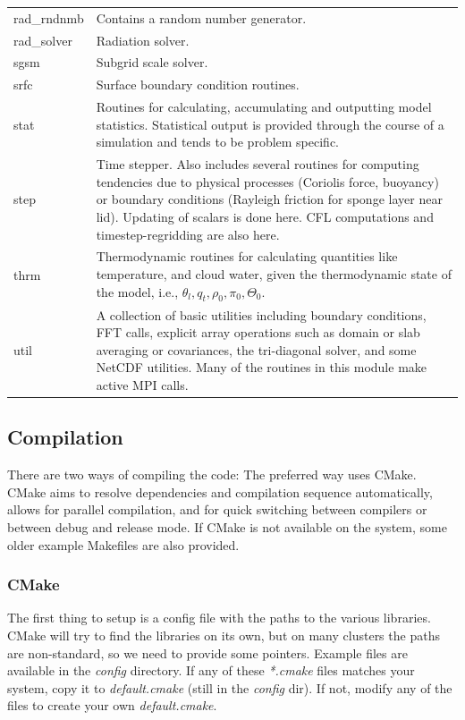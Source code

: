 \documentclass[11pt,a4paper]{article}
\begin{document}
\begin{table}
\begin{center}
\begin{tabular}[htb]{p{0.15\linewidth}p{0.85\linewidth}}
\\ rad\_rndnmb & Contains a random number generator.
\\ rad\_solver & Radiation solver.
\\ sgsm &  Subgrid scale solver.
\\ srfc &  Surface boundary condition routines.
\\ stat &  Routines for calculating, accumulating and outputting model
statistics.  Statistical output is provided through the course of a
simulation and tends to be problem specific.
\\ step &  Time stepper.  Also includes several routines for computing
tendencies due to physical processes (Coriolis force, buoyancy) or
boundary conditions (Rayleigh friction for sponge layer near lid).
Updating of scalars is done here. CFL computations and
timestep-regridding are also here.
\\ thrm & Thermodynamic routines for calculating
quantities like temperature, and cloud water, given the thermodynamic
state of the model, i.e., $\theta_l,q_t,\rho_0,\pi_0,\Theta_0.$
\\ util & A collection of basic utilities including
boundary conditions, FFT calls, explicit array operations such as
domain or slab averaging or covariances, the tri-diagonal solver, and
some NetCDF utilities.  Many of the routines in this module make
active MPI calls.\\ \hline \hline
\end{tabular}
\end{center}
\end{table}

\subsection{Compilation}
There are two ways of compiling the code: The preferred way uses CMake. CMake aims to resolve dependencies and compilation sequence automatically, allows for parallel compilation, and for quick switching between compilers or between debug and release mode.
If CMake is not available on the system, some older example Makefiles are also provided.

\subsubsection{CMake}
The first thing to setup is a config file with the paths to the various libraries. CMake will try to find the libraries on its own, but on many clusters the paths are non-standard, so we need to provide some pointers. Example files are available in the \emph{config} directory. If any of these \emph{*.cmake} files matches your system, copy it to \emph{default.cmake} (still in the \emph{config} dir). If not, modify any of the files to create your own \emph{default.cmake}. 
\end{document}
